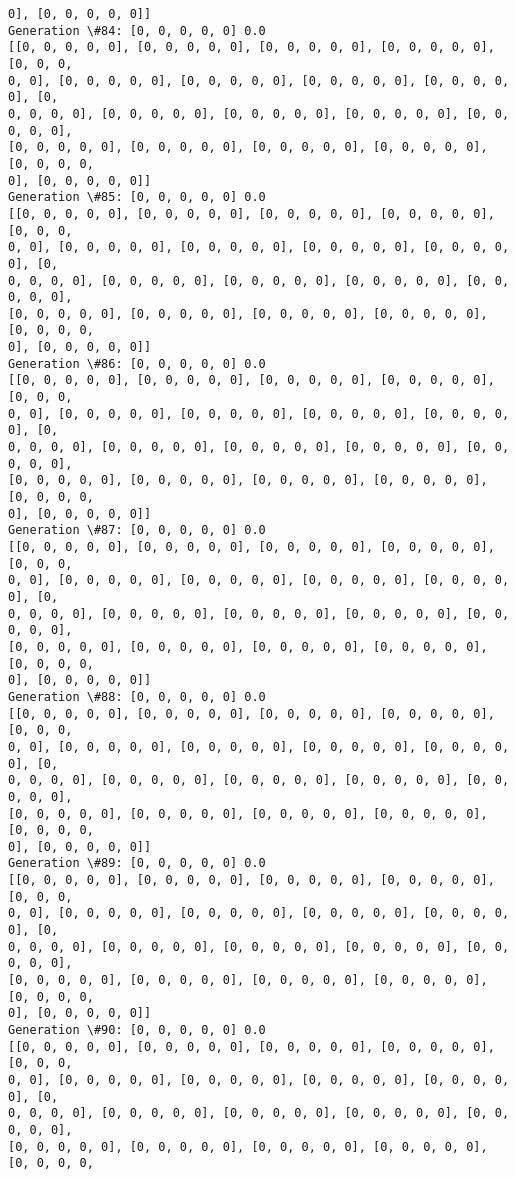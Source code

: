\documentclass[11pt]{article}
\begin{document}
\begin{Verbatim}[commandchars=\\\{\}]
0], [0, 0, 0, 0, 0]]
Generation \#84: [0, 0, 0, 0, 0] 0.0
[[0, 0, 0, 0, 0], [0, 0, 0, 0, 0], [0, 0, 0, 0, 0], [0, 0, 0, 0, 0], [0, 0, 0,
0, 0], [0, 0, 0, 0, 0], [0, 0, 0, 0, 0], [0, 0, 0, 0, 0], [0, 0, 0, 0, 0], [0,
0, 0, 0, 0], [0, 0, 0, 0, 0], [0, 0, 0, 0, 0], [0, 0, 0, 0, 0], [0, 0, 0, 0, 0],
[0, 0, 0, 0, 0], [0, 0, 0, 0, 0], [0, 0, 0, 0, 0], [0, 0, 0, 0, 0], [0, 0, 0, 0,
0], [0, 0, 0, 0, 0]]
Generation \#85: [0, 0, 0, 0, 0] 0.0
[[0, 0, 0, 0, 0], [0, 0, 0, 0, 0], [0, 0, 0, 0, 0], [0, 0, 0, 0, 0], [0, 0, 0,
0, 0], [0, 0, 0, 0, 0], [0, 0, 0, 0, 0], [0, 0, 0, 0, 0], [0, 0, 0, 0, 0], [0,
0, 0, 0, 0], [0, 0, 0, 0, 0], [0, 0, 0, 0, 0], [0, 0, 0, 0, 0], [0, 0, 0, 0, 0],
[0, 0, 0, 0, 0], [0, 0, 0, 0, 0], [0, 0, 0, 0, 0], [0, 0, 0, 0, 0], [0, 0, 0, 0,
0], [0, 0, 0, 0, 0]]
Generation \#86: [0, 0, 0, 0, 0] 0.0
[[0, 0, 0, 0, 0], [0, 0, 0, 0, 0], [0, 0, 0, 0, 0], [0, 0, 0, 0, 0], [0, 0, 0,
0, 0], [0, 0, 0, 0, 0], [0, 0, 0, 0, 0], [0, 0, 0, 0, 0], [0, 0, 0, 0, 0], [0,
0, 0, 0, 0], [0, 0, 0, 0, 0], [0, 0, 0, 0, 0], [0, 0, 0, 0, 0], [0, 0, 0, 0, 0],
[0, 0, 0, 0, 0], [0, 0, 0, 0, 0], [0, 0, 0, 0, 0], [0, 0, 0, 0, 0], [0, 0, 0, 0,
0], [0, 0, 0, 0, 0]]
Generation \#87: [0, 0, 0, 0, 0] 0.0
[[0, 0, 0, 0, 0], [0, 0, 0, 0, 0], [0, 0, 0, 0, 0], [0, 0, 0, 0, 0], [0, 0, 0,
0, 0], [0, 0, 0, 0, 0], [0, 0, 0, 0, 0], [0, 0, 0, 0, 0], [0, 0, 0, 0, 0], [0,
0, 0, 0, 0], [0, 0, 0, 0, 0], [0, 0, 0, 0, 0], [0, 0, 0, 0, 0], [0, 0, 0, 0, 0],
[0, 0, 0, 0, 0], [0, 0, 0, 0, 0], [0, 0, 0, 0, 0], [0, 0, 0, 0, 0], [0, 0, 0, 0,
0], [0, 0, 0, 0, 0]]
Generation \#88: [0, 0, 0, 0, 0] 0.0
[[0, 0, 0, 0, 0], [0, 0, 0, 0, 0], [0, 0, 0, 0, 0], [0, 0, 0, 0, 0], [0, 0, 0,
0, 0], [0, 0, 0, 0, 0], [0, 0, 0, 0, 0], [0, 0, 0, 0, 0], [0, 0, 0, 0, 0], [0,
0, 0, 0, 0], [0, 0, 0, 0, 0], [0, 0, 0, 0, 0], [0, 0, 0, 0, 0], [0, 0, 0, 0, 0],
[0, 0, 0, 0, 0], [0, 0, 0, 0, 0], [0, 0, 0, 0, 0], [0, 0, 0, 0, 0], [0, 0, 0, 0,
0], [0, 0, 0, 0, 0]]
Generation \#89: [0, 0, 0, 0, 0] 0.0
[[0, 0, 0, 0, 0], [0, 0, 0, 0, 0], [0, 0, 0, 0, 0], [0, 0, 0, 0, 0], [0, 0, 0,
0, 0], [0, 0, 0, 0, 0], [0, 0, 0, 0, 0], [0, 0, 0, 0, 0], [0, 0, 0, 0, 0], [0,
0, 0, 0, 0], [0, 0, 0, 0, 0], [0, 0, 0, 0, 0], [0, 0, 0, 0, 0], [0, 0, 0, 0, 0],
[0, 0, 0, 0, 0], [0, 0, 0, 0, 0], [0, 0, 0, 0, 0], [0, 0, 0, 0, 0], [0, 0, 0, 0,
0], [0, 0, 0, 0, 0]]
Generation \#90: [0, 0, 0, 0, 0] 0.0
[[0, 0, 0, 0, 0], [0, 0, 0, 0, 0], [0, 0, 0, 0, 0], [0, 0, 0, 0, 0], [0, 0, 0,
0, 0], [0, 0, 0, 0, 0], [0, 0, 0, 0, 0], [0, 0, 0, 0, 0], [0, 0, 0, 0, 0], [0,
0, 0, 0, 0], [0, 0, 0, 0, 0], [0, 0, 0, 0, 0], [0, 0, 0, 0, 0], [0, 0, 0, 0, 0],
[0, 0, 0, 0, 0], [0, 0, 0, 0, 0], [0, 0, 0, 0, 0], [0, 0, 0, 0, 0], [0, 0, 0, 0,

\end{Verbatim}
\end{document}
